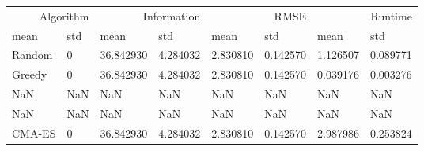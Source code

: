 \begin{tabular}{llllllll}
\toprule
\multicolumn{2}{r}{Algorithm} & \multicolumn{2}{r}{Information} & \multicolumn{2}{r}{RMSE} & \multicolumn{2}{r}{Runtime} \\
mean & std & mean & std & mean & std & mean & std \\
\midrule
Random & 0 & 36.842930 & 4.284032 & 2.830810 & 0.142570 & 1.126507 & 0.089771 \\
Greedy & 0 & 36.842930 & 4.284032 & 2.830810 & 0.142570 & 0.039176 & 0.003276 \\
NaN & NaN & NaN & NaN & NaN & NaN & NaN & NaN \\
NaN & NaN & NaN & NaN & NaN & NaN & NaN & NaN \\
CMA-ES & 0 & 36.842930 & 4.284032 & 2.830810 & 0.142570 & 2.987986 & 0.253824 \\
\bottomrule
\end{tabular}
